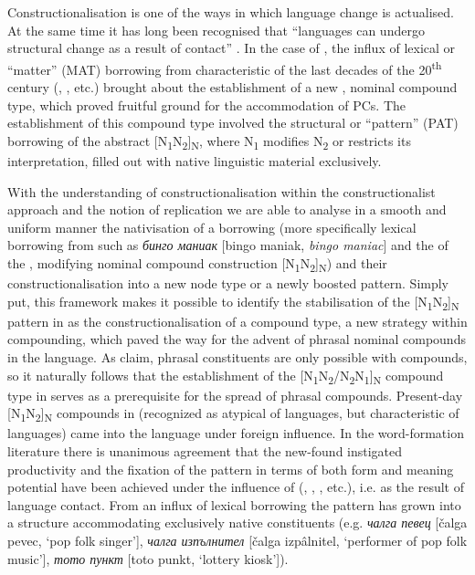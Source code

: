\documentclass[output=paper]{LSP/langsci}
\begin{document}
                                                                  Constructionalisation is one of the ways in which language change is actualised. At the same time it has long been recognised that “languages can undergo structural change as a result of contact” \citep[48]{Heine2006}. In the case of , the influx of lexical or ``matter'' (MAT) borrowing from  characteristic of the last decades of the 20\textsuperscript{th} century (\citealt{Krumova-Cvetkova2013}, \citealt{Radeva2007}, etc.) brought about the establishment of a new , nominal compound type, which proved fruitful ground for the accommodation of PCs. The establishment of this compound type involved the structural or ``pattern'' (PAT) borrowing of the abstract  [N\textsubscript{1}N\textsubscript{2}]\textsubscript{N}, where N\textsubscript{1} modifies N\textsubscript{2} or restricts its interpretation, filled out with native linguistic material exclusively. 


With the understanding of constructionalisation within the constructionalist approach and the notion of  replication we are able to analyse in a smooth and uniform manner the nativisation of a borrowing (more specifically lexical borrowing from  such as \textit{{бинго маниак} }[bingo maniak, \textit{bingo maniac}] and the  of the , modifying nominal compound construction [N\textsubscript{1}N\textsubscript{2}]\textsubscript{N}) and their constructionalisation into a new node type or a newly boosted pattern. Simply put, this framework makes it possible to identify the stabilisation of the [N\textsubscript{1}N\textsubscript{2}]\textsubscript{N} pattern in  as the constructionalisation of a compound type, a new strategy within compounding, which paved the way for the advent of phrasal nominal compounds in the language. As  \citet{Arcodia2009} claim, phrasal constituents are only possible with  compounds, so it naturally follows that the establishment of the  [N\textsubscript{1}N\textsubscript{2}/N\textsubscript{2}N\textsubscript{1}]\textsubscript{N} compound type in  serves as a prerequisite for the spread of phrasal compounds. Present-day [N\textsubscript{1}N\textsubscript{2}]\textsubscript{N} compounds in  (recognized as atypical of  languages, but characteristic of  languages) came into the language under foreign influence. In the  word-formation literature there is unanimous agreement that the new-found instigated productivity and the fixation of the pattern in terms of both form and meaning potential have been achieved under the influence of  (\citealt{Krumova-Cvetkova2013}, \citealt{Murdarov1983}, \citealt{Radeva2007}, etc.), i.e. as the result of language contact. From an influx of lexical borrowing the pattern has grown into a structure accommodating exclusively native constituents (e.g. \textit{{чалга певец} }[čalga pevec, ‘pop folk singer’], \textit{{чалга изпълнител} }[čalga izpâlnitel, ‘performer of pop folk music’], \textit{{тото пункт} }[toto punkt, ‘lottery kiosk’]).
\end{document}
